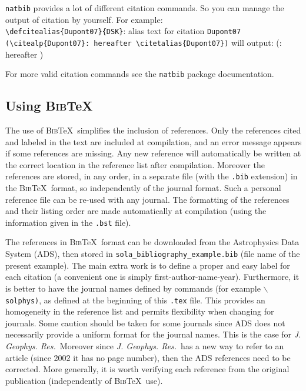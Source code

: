 \documentclass[namedreferences]{solarphysics}
\newcommand{\BibTeX}{\textsc{Bib}\TeX}
\newcommand{\jgr}{    {\it J. Geophys. Res.}}
\begin{document}
\begin{article}
\texttt{natbib} provides a lot of different citation commands. So you can manage the output of citation by yourself.
For example:\\
\verb+\defcitealias{Dupont07}{DSK}+: alias text for citation \texttt{Dupont07}\\
\verb+(\citealp{Dupont07}: hereafter \citetalias{Dupont07})+ will output:\linebreak 
                                  (\citealp{Dupont07}: hereafter )

For more valid citation commands see the \texttt{natbib} package documentation.


\subsection{Using \BibTeX} %
  \label{S-BibTeX}
  The use of \BibTeX\ simplifies the inclusion of references. Only the 
references cited and labeled in the text are included at compilation, 
and an error message appears if some references
are missing.  Any new reference will automatically be written at the correct 
location in the reference list after compilation. 
Moreover the references are stored, in any order, in a separate file
(with the \texttt{.bib} extension) in the \BibTeX\ format, so independently of 
the journal format. Such a personal reference file can be re-used with any journal.
The formatting of the references and their listing order are made automatically
at compilation (using the information given in the \texttt{.bst} file). 
        
  The references in \BibTeX\ format can be downloaded from the 
Astrophysics Data System (ADS), then stored
in \verb+sola_bibliography_example.bib+  (file name of the present example).
The main extra work is to define a proper and easy label for each citation
(a convenient one is simply first-author-name-year).  Furthermore, it is better
to have the journal names defined by commands (for example 
\texttt{$\backslash$solphys)}, as defined at the beginning of 
this \texttt{.tex} file.
This provides an homogeneity in the reference list and permits flexibility
when changing for journals.   Some caution should be taken for some journals
since ADS does not necessarily provide a uniform format for the
journal names. This is the case for \jgr\  Moreover since
\jgr\ has a new way to refer to an article 
(since 2002 it has no page number), then the ADS references need to be corrected. 
More generally, it is worth verifying
each reference from the original publication (independently of \BibTeX\ use).


\end{article}
\end{document}
